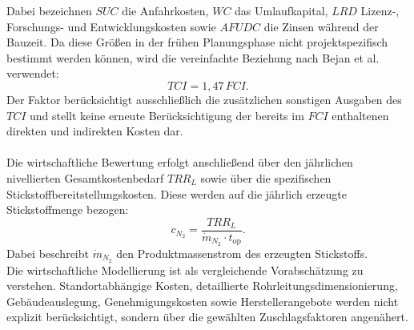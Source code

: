 Dabei bezeichnen \(SUC\) die Anfahrkosten, \(WC\) das Umlaufkapital,
\(LRD\) Lizenz-, Forschungs- und Entwicklungskosten sowie \(AFUDC\) die
Zinsen während der Bauzeit. Da diese Größen in der frühen Planungsphase nicht
projektspezifisch bestimmt werden können, wird die vereinfachte Beziehung nach
Bejan et al. verwendet:
\begin{equation}
TCI = 1{,}47\,FCI .
\end{equation}
Der Faktor berücksichtigt ausschließlich die zusätzlichen sonstigen Ausgaben
des \(TCI\) und stellt keine erneute Berücksichtigung der bereits im \(FCI\)
enthaltenen direkten und indirekten Kosten dar.\\
\\
Die wirtschaftliche Bewertung erfolgt anschließend über den jährlichen nivellierten Gesamtkostenbedarf $TRR_L$ sowie über die spezifischen Stickstoffbereitstellungskosten. Diese werden auf die jährlich erzeugte
Stickstoffmenge bezogen:
\begin{equation}
c_{N_2}
=
\frac{TRR_L}{\dot m_{N_2}\cdot t_\mathrm{op}} .
\end{equation}
Dabei beschreibt $\dot m_{N_2}$ den Produktmassenstrom des erzeugten Stickstoffs.\\
Die wirtschaftliche Modellierung ist als vergleichende Vorabschätzung zu verstehen. Standortabhängige Kosten, detaillierte Rohrleitungsdimensionierung,
Gebäudeauslegung, Genehmigungskosten sowie Herstellerangebote werden nicht explizit berücksichtigt, sondern über die gewählten Zuschlagsfaktoren angenähert.


